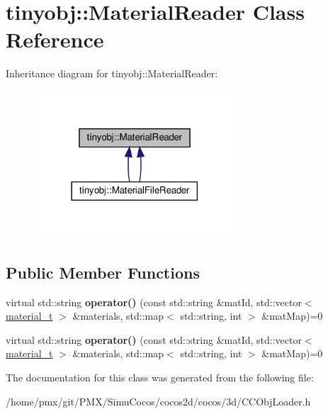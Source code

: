 \hypertarget{classtinyobj_1_1MaterialReader}{}\section{tinyobj\+:\+:Material\+Reader Class Reference}
\label{classtinyobj_1_1MaterialReader}


Inheritance diagram for tinyobj\+:\+:Material\+Reader\+:
\nopagebreak
\begin{figure}[H]
\begin{center}
\leavevmode
\includegraphics[width=213pt]{classtinyobj_1_1MaterialReader__inherit__graph}
\end{center}
\end{figure}
\subsection*{Public Member Functions}
\begin{DoxyCompactItemize}
\item 
\mbox{\label{classtinyobj_1_1MaterialReader_afc27ac917abd33dc3ec4a9ae7a519962}} 
virtual std\+::string {\bfseries operator()} (const std\+::string \&mat\+Id, std\+::vector$<$ \hyperlink{structtinyobj_1_1material__t}{material\+\_\+t} $>$ \&materials, std\+::map$<$ std\+::string, int $>$ \&mat\+Map)=0
\item 
\mbox{\label{classtinyobj_1_1MaterialReader_afc27ac917abd33dc3ec4a9ae7a519962}} 
virtual std\+::string {\bfseries operator()} (const std\+::string \&mat\+Id, std\+::vector$<$ \hyperlink{structtinyobj_1_1material__t}{material\+\_\+t} $>$ \&materials, std\+::map$<$ std\+::string, int $>$ \&mat\+Map)=0
\end{DoxyCompactItemize}


The documentation for this class was generated from the following file\+:\begin{DoxyCompactItemize}
\item 
/home/pmx/git/\+P\+M\+X/\+Simu\+Cocos/cocos2d/cocos/3d/C\+C\+Obj\+Loader.\+h\end{DoxyCompactItemize}
